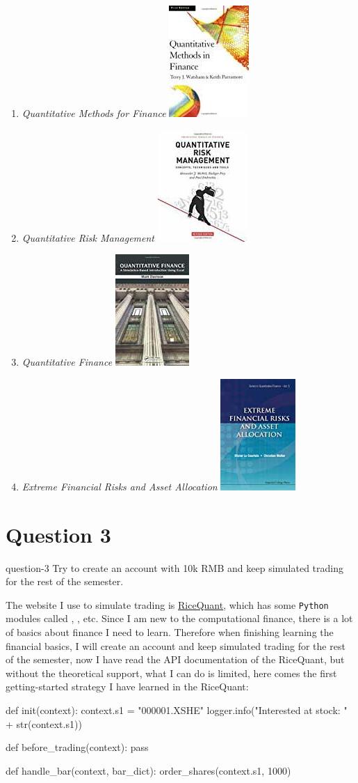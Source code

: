 \begin{enumerate}
    \item \emph{Quantitative Methods for Finance}
        \hfill\includegraphics[height=.5in]{figures/2019-09-17-finance-books-7.jpg}
    \item \emph{Quantitative Risk Management}
        \hfill\includegraphics[height=.5in]{figures/2019-09-17-finance-books-8.jpg}
    \item \emph{Quantitative Finance}
        \hfill\includegraphics[height=.5in]{figures/2019-09-17-finance-books-9.jpg}
    \item \emph{Extreme Financial Risks and Asset Allocation}
        \hfill\includegraphics[height=.5in]{figures/2019-09-17-finance-books-10.jpg}
\end{enumerate}



\section{Question 3}\label{S:3}
\begin{statebox}{}{question-3}
    Try to create an account with 10k RMB and keep simulated trading for the rest of the semester.
\end{statebox}
The website I use to simulate trading is \href{https://www.ricequant.com/quant/}{RiceQuant}, which has some \texttt{Python} modules called , , etc. Since I am new to the computational finance, there is a lot of basics about finance I need to learn. Therefore when finishing learning the financial basics, I will create an account and keep simulated trading for the rest of the semester, now I have read the API documentation of the RiceQuant, but without the theoretical support, what I can do is limited, here comes the first getting-started strategy I have learned in the RiceQuant:
\begin{pylist}
def init(context):
    context.s1 = "000001.XSHE"
    logger.info("Interested at stock: " + str(context.s1))

def before_trading(context):
    pass

def handle_bar(context, bar_dict):
    order_shares(context.s1, 1000)
\end{pylist}\label{C:rice-quant-getting-started}

